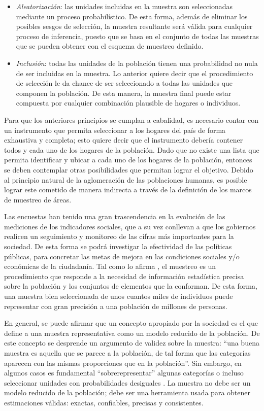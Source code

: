 \documentclass[
  10pt,
  spanish,
]{book}
\providecommand{\tightlist}{%
  \setlength{\itemsep}{0pt}\setlength{\parskip}{0pt}}
\begin{document}
\begin{itemize}
\tightlist
\item
  \emph{Aleatorización}: las unidades incluidas en la muestra son seleccionadas mediante un proceso probabilístico. De esta forma, además de eliminar los posibles sesgos de selección, la muestra resultante será válida para cualquier proceso de inferencia, puesto que se basa en el conjunto de todas las muestras que se pueden obtener con el esquema de muestreo definido.
\item
  \emph{Inclusión}: todas las unidades de la población tienen una probabilidad no nula de ser incluidas en la muestra. Lo anterior quiere decir que el procedimiento de selección le da chance de ser seleccionado a todas las unidades que componen la población. De esta manera, la muestra final puede estar compuesta por cualquier combinación plausible de hogares o individuos.
\end{itemize}

Para que los anteriores principios se cumplan a cabalidad, es necesario contar con un instrumento que permita seleccionar a los hogares del país de forma exhaustiva y completa; esto quiere decir que el instrumento debería contener todos y cada uno de los hogares de la población. Dado que no existe una lista que permita identificar y ubicar a cada uno de los hogares de la población, entonces se deben contemplar otras posibilidades que permitan lograr el objetivo. Debido al principio natural de la aglomeración de las poblaciones humanas, es posible lograr este cometido de manera indirecta a través de la definición de los marcos de muestreo de áreas.

Las encuestas han tenido una gran trascendencia en la evolución de las mediciones de los indicadores sociales, que a su vez conllevan a que los gobiernos realicen un seguimiento y monitoreo de las cifras más importantes para la sociedad. De esta forma se podrá investigar la efectividad de las políticas públicas, para concretar las metas de mejora en las condiciones sociales y/o económicas de la ciudadanía. Tal como lo afirma \citet{Gutierrez_2016}, el muestreo es un procedimiento que responde a la necesidad de información estadística precisa sobre la población y los conjuntos de elementos que la conforman. De esta forma, una muestra bien seleccionada de unos cuantos miles de individuos puede representar con gran precisión a una población de millones de personas.

En general, se puede afirmar que un concepto apropiado por la sociedad es el que define a una muestra representativa como un modelo reducido de la población. De este concepto se desprende un argumento de validez sobre la muestra: ``una buena muestra es aquella que se parece a la población, de tal forma que las categorías aparecen con las mismas proporciones que en la población''. Sin embargo, en algunos casos es fundamental ``sobrerepresentar'' algunas categorías o incluso seleccionar unidades con probabilidades desiguales \citep{Tille2006}. La muestra no debe ser un modelo reducido de la población; debe ser una herramienta usada para obtener estimaciones válidas: exactas, confiables, precisas y consistentes.
\end{document}
